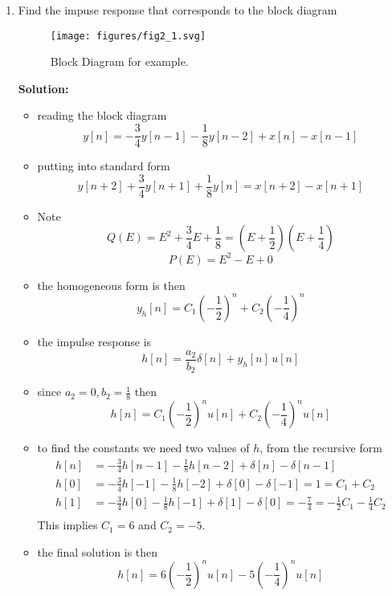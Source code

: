 \documentclass{article}
\begin{document}
\begin{enumerate}
\item Find the impuse response that corresponds to the block diagram

  \begin{figure}
    \centering
    \texttt{[image: figures/fig2\_1.svg]}
    \caption{Block Diagram for example.}
  \end{figure}
  \textbf{Solution:}
  \begin{itemize}
  \item reading the block diagram
    \[
    y[n] = -\frac{3}{4} y[n-1] - \frac{1}{8} y[n-2] + x[n] - x[n-1]
    \]
  \item putting into standard form
    \[
    y[n+2] + \frac{3}{4} y[n+1] + \frac{1}{8} y[n] = x[n+2] - x[n+1]
    \]
  \item Note
    \[
    Q(E) = E^2 + \frac{3}{4}E + \frac{1}{8} = \left(E + \frac{1}{2}\right)\left(E + \frac{1}{4}\right)
    \]
    \[
    P(E) = E^2 - E + 0
    \]
  \item the homogeneous form is then
    \[
    y_h[n] = C_1 \left(-\frac{1}{2}\right)^n + C_2\left(-\frac{1}{4}\right)^n
    \]
  \item the impulse response is
    \[
    h[n] = \frac{a_2}{b_2}\delta[n] + y_h[n]\, u[n]
    \]
  \item since $a_2 = 0, b_2 = \frac{1}{8}$ then
    \[
    h[n] = C_1 \left(-\frac{1}{2}\right)^n u[n] + C_2\left(-\frac{1}{4}\right)^n u[n]
    \]
  \item to find the constants we need two values of $h$, from the recursive form
    \begin{align}
      h[n] &= -\frac{3}{4} h[n-1] - \frac{1}{8} h[n-2] + \delta[n] - \delta[n-1]\\
      h[0] &= -\frac{3}{4} h[-1] - \frac{1}{8} h[-2] + \delta[0] - \delta[-1] = 1 = C_1 + C_2\\
      h[1] &= -\frac{3}{4} h[0] - \frac{1}{8} h[-1] + \delta[1] - \delta[0] = -\frac{7}{4} = -\frac{1}{2} C_1 -\frac{1}{4} C_2\\
    \end{align}
    This implies $C_1 = 6$ and $C_2 = -5$.
  \item the final solution is then
    \[
    h[n] = 6 \left(-\frac{1}{2}\right)^n u[n] -5 \left(-\frac{1}{4}\right)^n u[n]
    \]
    
  \end{itemize}

\end{enumerate}
\end{document}
